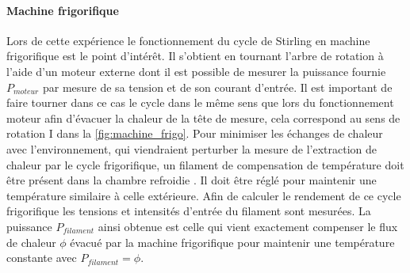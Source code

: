 \paragraph*{Machine frigorifique}
Lors de cette expérience le fonctionnement du cycle de Stirling en machine frigorifique est le point d'intérêt. Il s'obtient en tournant l'arbre de rotation à l'aide d'un moteur externe dont il est possible de mesurer la puissance fournie \(P_{moteur}\) par mesure de sa tension et de son courant d'entrée. Il est important de faire tourner dans ce cas le cycle dans le même sens que lors du fonctionnement moteur afin d'évacuer la chaleur de la tête de mesure, cela correspond au sens de rotation I dans la \autoref{fig:machine_frigo}. Pour minimiser les échanges de chaleur avec l'environnement, qui viendraient perturber la mesure de l'extraction de chaleur par le cycle frigorifique, un filament de compensation de température doit être présent dans la chambre refroidie \cite{notice}. Il doit être réglé pour maintenir une température similaire à celle extérieure. Afin de calculer le rendement de ce cycle frigorifique les tensions et intensités d'entrée du filament sont mesurées. La puissance \(P_{filament}\) ainsi obtenue est celle qui vient exactement compenser le flux de chaleur \(\phi\) évacué par la machine frigorifique pour maintenir une température constante avec \(P_{filament} = \phi\).
